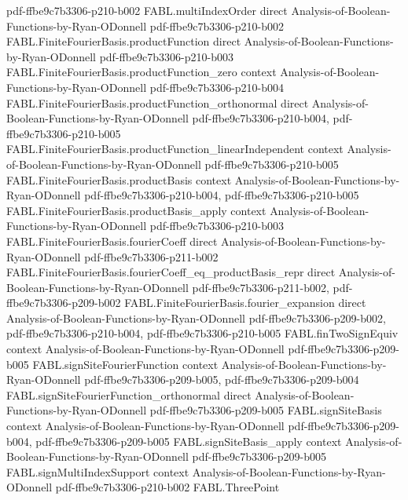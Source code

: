 \begin{theorem}
  {pdf-ffbe9c7b3306-p210-b002}
\proofstep
  {FABL.multiIndexOrder}
  {direct}
  {Analysis-of-Boolean-Functions-by-Ryan-ODonnell}
  {pdf-ffbe9c7b3306-p210-b002}
\proofstep
  {FABL.FiniteFourierBasis.productFunction}
  {direct}
  {Analysis-of-Boolean-Functions-by-Ryan-ODonnell}
  {pdf-ffbe9c7b3306-p210-b003}
\proofstep
  {FABL.FiniteFourierBasis.productFunction_zero}
  {context}
  {Analysis-of-Boolean-Functions-by-Ryan-ODonnell}
  {pdf-ffbe9c7b3306-p210-b004}
\proofstep
  {FABL.FiniteFourierBasis.productFunction_orthonormal}
  {direct}
  {Analysis-of-Boolean-Functions-by-Ryan-ODonnell}
  {pdf-ffbe9c7b3306-p210-b004,
    pdf-ffbe9c7b3306-p210-b005}
\proofstep
  {FABL.FiniteFourierBasis.productFunction_linearIndependent}
  {context}
  {Analysis-of-Boolean-Functions-by-Ryan-ODonnell}
  {pdf-ffbe9c7b3306-p210-b005}
\proofstep
  {FABL.FiniteFourierBasis.productBasis}
  {context}
  {Analysis-of-Boolean-Functions-by-Ryan-ODonnell}
  {pdf-ffbe9c7b3306-p210-b004,
    pdf-ffbe9c7b3306-p210-b005}
\proofstep
  {FABL.FiniteFourierBasis.productBasis_apply}
  {context}
  {Analysis-of-Boolean-Functions-by-Ryan-ODonnell}
  {pdf-ffbe9c7b3306-p210-b003}
\proofstep
  {FABL.FiniteFourierBasis.fourierCoeff}
  {direct}
  {Analysis-of-Boolean-Functions-by-Ryan-ODonnell}
  {pdf-ffbe9c7b3306-p211-b002}
\proofstep
  {FABL.FiniteFourierBasis.fourierCoeff_eq_productBasis_repr}
  {direct}
  {Analysis-of-Boolean-Functions-by-Ryan-ODonnell}
  {pdf-ffbe9c7b3306-p211-b002,
    pdf-ffbe9c7b3306-p209-b002}
\proofstep
  {FABL.FiniteFourierBasis.fourier_expansion}
  {direct}
  {Analysis-of-Boolean-Functions-by-Ryan-ODonnell}
  {pdf-ffbe9c7b3306-p209-b002,
    pdf-ffbe9c7b3306-p210-b004,
    pdf-ffbe9c7b3306-p210-b005}
\proofstep
  {FABL.finTwoSignEquiv}
  {context}
  {Analysis-of-Boolean-Functions-by-Ryan-ODonnell}
  {pdf-ffbe9c7b3306-p209-b005}
\proofstep
  {FABL.signSiteFourierFunction}
  {context}
  {Analysis-of-Boolean-Functions-by-Ryan-ODonnell}
  {pdf-ffbe9c7b3306-p209-b005,
    pdf-ffbe9c7b3306-p209-b004}
\proofstep
  {FABL.signSiteFourierFunction_orthonormal}
  {direct}
  {Analysis-of-Boolean-Functions-by-Ryan-ODonnell}
  {pdf-ffbe9c7b3306-p209-b005}
\proofstep
  {FABL.signSiteBasis}
  {context}
  {Analysis-of-Boolean-Functions-by-Ryan-ODonnell}
  {pdf-ffbe9c7b3306-p209-b004,
    pdf-ffbe9c7b3306-p209-b005}
\proofstep
  {FABL.signSiteBasis_apply}
  {context}
  {Analysis-of-Boolean-Functions-by-Ryan-ODonnell}
  {pdf-ffbe9c7b3306-p209-b005}
\proofstep
  {FABL.signMultiIndexSupport}
  {context}
  {Analysis-of-Boolean-Functions-by-Ryan-ODonnell}
  {pdf-ffbe9c7b3306-p210-b002}
\proofstep
  {FABL.ThreePoint}

\end{theorem}
